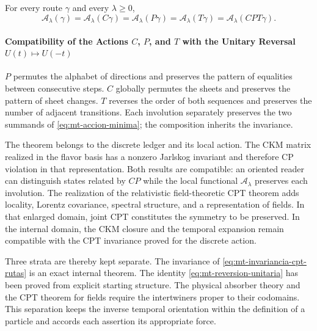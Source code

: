 \begin{resultado}[title={Theorem: Individual and joint discrete invariance}]
\label{thm:mt-cpt-rutas}
For every route $\gamma$ and every $\lambda\geq0$,
\begin{equation}
 \mathcal A_\lambda(\gamma)
 =\mathcal A_\lambda(C\gamma)
 =\mathcal A_\lambda(P\gamma)
 =\mathcal A_\lambda(T\gamma)
 =\mathcal A_\lambda(CPT\gamma).
 \label{eq:mt-invariancia-cpt-rutas}
\end{equation}
\end{resultado}

\paragraph{Compatibility of the Actions \(C\), \(P\), and \(T\) with the Unitary Reversal \(U(t)\mapsto U(-t)\)}
$P$ permutes the alphabet of directions and preserves the pattern of equalities between consecutive steps. $C$ globally permutes the sheets and preserves the pattern of sheet changes. $T$ reverses the order of both sequences and preserves the number of adjacent transitions. Each involution separately preserves the two summands of \eqref{eq:mt-accion-minima}; the composition inherits the invariance.


The theorem belongs to the discrete ledger and its local action. The CKM matrix realized in the flavor basis has a nonzero Jarlskog invariant and therefore CP violation in that representation. Both results are compatible: an oriented reader can distinguish states related by $CP$ while the local functional $\mathcal A_\lambda$ preserves each involution. The realization of the relativistic field-theoretic CPT theorem adds locality, Lorentz covariance, spectral structure, and a representation of fields. In that enlarged domain, joint CPT constitutes the symmetry to be preserved. In the internal domain, the CKM closure and the temporal expansion remain compatible with the CPT invariance proved for the discrete action.

Three strata are thereby kept separate. The invariance of
\eqref{eq:mt-invariancia-cpt-rutas} is an exact internal theorem. The identity
\eqref{eq:mt-reversion-unitaria} has been proved from explicit starting
structure. The physical absorber theory and the CPT theorem for fields require
the intertwiners proper to their codomains. This separation keeps the
inverse temporal orientation within the definition of a particle and accords
each assertion its appropriate force.
